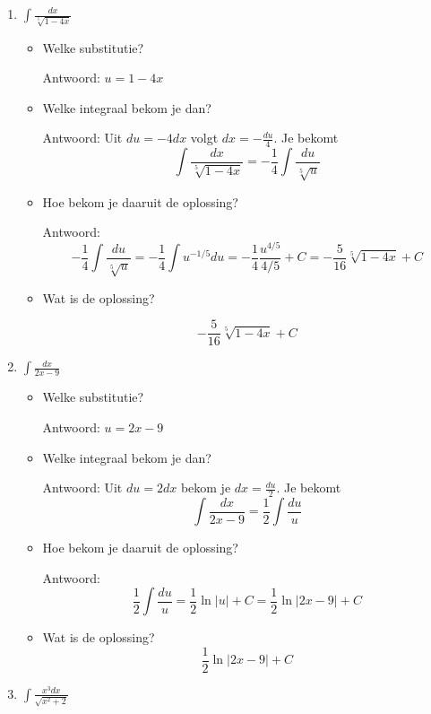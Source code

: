 \begin{enumerate}
	
	\item $\int \frac{dx}{\sqrt[5]{1-4x}}$
	
	\begin{itemize}
		\item Welke substitutie?
		
		Antwoord: $u=1-4x$
		\item Welke integraal bekom je dan?
		
		Antwoord: Uit $du=-4dx$ volgt $dx=-\frac{du}{4}$.
		Je bekomt
		\[
		\int \frac{dx}{\sqrt[5]{1-4x}}=-\frac{1}{4}\int \frac{du}{\sqrt[5]{u} }
		\]
		
		\item Hoe bekom je daaruit de oplossing?
		
		Antwoord: 
		\[
		-\frac{1}{4}\int \frac{du}{\sqrt[5]{u}}=-\frac{1}{4}\int u^{-1/5}du = -\frac{1}{4}\frac{u^{4/5}}{4/5}+C=-\frac{5}{16}\sqrt[5]{1-4x}+C 
		\]
		
		\item Wat is de oplossing?
		
		\[
		-\frac{5}{16}\sqrt[5]{1-4x}+C 
		\]
	\end{itemize}
	
	
	\item $\int \frac{dx}{2x-9}$
	
	\begin{itemize}
		\item Welke substitutie?
		
		Antwoord: $u=2x-9$
		
		\item Welke integraal bekom je dan?
		
		Antwoord: Uit $du=2dx$ bekom je $dx=\frac{du}{2}$.
		Je bekomt
		\[
		\int \frac{dx}{2x-9}=\frac{1}{2} \int \frac{du}{u}
		\]
		
		\item Hoe bekom je daaruit de oplossing?
		
		Antwoord:
		\[
		\frac{1}{2} \int \frac{du}{u}=\frac{1}{2} \ln \vert u \vert+C=\frac{1}{2} \ln \vert 2x-9 \vert +C
		\]
		
		\item Wat is de oplossing?
		\[
		\frac{1}{2} \ln \vert 2x-9 \vert +C
		\]
		
	\end{itemize}
	
	\item $\int \frac{x^3dx}{\sqrt{x^2+2}}$
	

\end{enumerate}
